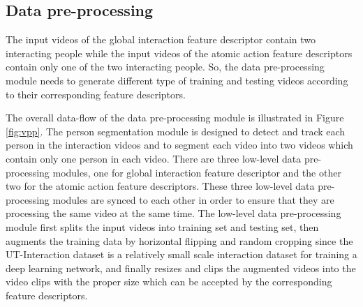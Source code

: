 \subsection{Data pre-processing}
The input videos of the global interaction feature descriptor contain two interacting people while the input videos of the atomic action feature descriptors contain only one of the two interacting people. So, the data pre-processing module needs to generate different type of training and testing videos according to their corresponding feature descriptors. 
\par
The overall data-flow of the data pre-processing module is illustrated in Figure \ref{fig:vpp}. The person segmentation module is designed to detect and track each person in the interaction videos and to segment each video into two videos which contain only one person in each video. There are three low-level data pre-processing modules, one for global interaction feature descriptor and the other two for the atomic action feature descriptors. These three low-level data pre-processing modules are synced to each other in order to ensure that they are processing the same video at the same time. The low-level data pre-processing module first splits the input videos into training set and testing set, then augments the training data by horizontal flipping and random cropping since the UT-Interaction dataset is a relatively small scale interaction dataset for training a deep learning network, and finally resizes and clips the augmented videos into the video clips with the proper size which can be accepted by the corresponding feature descriptors.  

